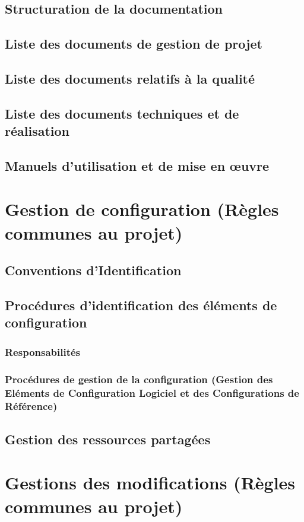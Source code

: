 \subsection{Structuration de la documentation}
\subsection{Liste des documents de gestion de projet}
\subsection{Liste des documents relatifs à la qualité}
\subsection{Liste des documents techniques et de réalisation}
\subsection{Manuels d’utilisation et de mise en œuvre}

\section{Gestion de configuration (Règles communes au projet)}
\subsection{Conventions d’Identification}
\subsection{Procédures d’identification des éléments de configuration} 
\subsubsection{Responsabilités}
\subsubsection{Procédures de gestion de la configuration (Gestion des Eléments de Configuration Logiciel et des Configurations de Référence)}
\subsection{Gestion des ressources partagées}
\section{Gestions des modifications  (Règles communes au projet)}
